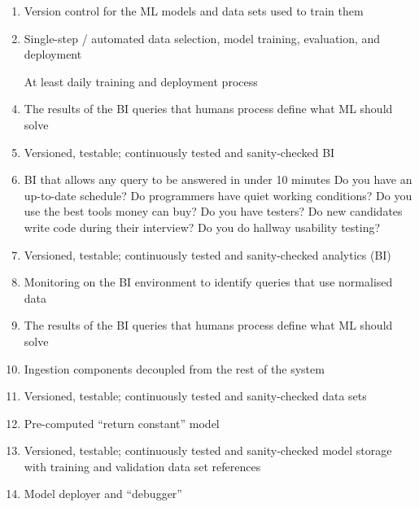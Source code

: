 \begin{enumerate}
  \item Version control for the ML models and data sets used to train them
  \item Single-step / automated data selection, model training, evaluation, and deployment
  \item [At least] daily training and deployment process
  \item The results of the BI queries that humans process define what ML should solve
  \item Versioned, testable; continuously tested and sanity-checked BI
  \item BI that allows any query to be answered in under 10 minutes
Do you have an up-to-date schedule?
Do programmers have quiet working conditions?
Do you use the best tools money can buy?
Do you have testers?
Do new candidates write code during their interview?
Do you do hallway usability testing?
  \item Versioned, testable; continuously tested and sanity-checked analytics (BI)  
  \item Monitoring on the BI environment to identify queries that use normalised data
  \item The results of the BI queries that humans process define what ML should solve
  \item Ingestion components decoupled from the rest of the system
  \item Versioned, testable; continuously tested and sanity-checked data sets 
  \label{txt:ml-code}\item Pre-computed ``return constant'' model
  \item Versioned, testable; continuously tested and sanity-checked model storage with training and validation data set references
  \item Model deployer and ``debugger''
\end{enumerate}

